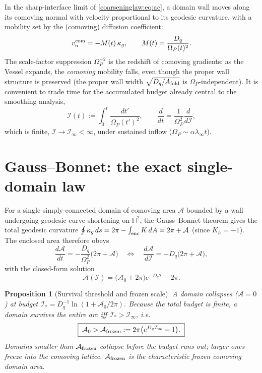 \documentclass[11pt,a4paper,oneside]{book}
\newcommand{\Op}{\Omega_P}
\newcommand{\Af}{A_{\rm fold}}
\newcommand{\Hh}{\mathbb{H}^2}
\newcommand{\Dq}{D_q}
\newcommand{\Ibud}{\mathcal I}
\newcommand{\Acom}{\mathcal A}
\theoremstyle{plain}
\newtheorem{proposition}{Proposition}[chapter]
\theoremstyle{definition}
\theoremstyle{remark}
\begin{document}
In the sharp-interface limit of \eqref{coarseninglaw:eq:ac}, a domain wall moves along its comoving normal with velocity
proportional to its geodesic curvature, with a mobility set by the (comoving) diffusion coefficient:
\begin{equation}
v_n^{\rm com}=-M(t)\,\kappa_g,
\qquad
M(t)=\frac{\Dq}{\Op(t)^{2}} .
\end{equation}
The scale-factor suppression $\Op^{-2}$ is the redshift of comoving gradients: as the Vessel expands, the
\emph{comoving} mobility falls, even though the proper wall structure is preserved (the proper wall width
$\sqrt{\Dq/\Af}$ is $\Op$-independent). It is convenient to trade time for the accumulated
budget already central to the smoothing analysis,
\begin{equation}
\Ibud(t):=\int_0^t\frac{dt'}{\Op(t')^{2}},
\qquad
\frac{d}{dt}=\frac{1}{\Op^2}\frac{d}{d\Ibud},
\end{equation}
which is finite, $\Ibud\to\Ibud_\infty<\infty$, under sustained inflow ($\Op\sim\alpha\lambda_\infty t$).

\section{Gauss--Bonnet: the exact single-domain law}

For a single simply-connected domain of comoving area $\Acom$ bounded by a wall undergoing geodesic
curve-shortening on $\Hh$, the Gauss--Bonnet theorem gives the total geodesic curvature
$\oint\kappa_g\,ds=2\pi-\int_{\rm enc}K\,dA=2\pi+\Acom$ (since $K_h=-1$). The enclosed area therefore obeys
\begin{equation}
\boxed{\;\frac{d\Acom}{dt}=-\frac{\Dq}{\Op^{2}}\bigl(2\pi+\Acom\bigr)
\quad\Longleftrightarrow\quad
\frac{d\Acom}{d\Ibud}=-\Dq\bigl(2\pi+\Acom\bigr),\;}
\end{equation}
with the closed-form solution
\begin{equation}
\boxed{\;\Acom(\Ibud)=\bigl(\Acom_0+2\pi\bigr)e^{-\Dq\Ibud}-2\pi .\;}
\end{equation}

\begin{proposition}[Survival threshold and frozen scale]\label{coarseninglaw:prop:gb}
A domain collapses ($\Acom=0$) at budget $\Ibud_\ast=\Dq^{-1}\ln(1+\Acom_0/2\pi)$. Because the total
budget is finite, a domain survives the entire arc iff $\Ibud_\ast>\Ibud_\infty$, i.e.
\begin{equation}
\boxed{\;\Acom_0>\Acom_{\rm frozen}:=2\pi\bigl(e^{\Dq\Ibud_\infty}-1\bigr).\;}
\end{equation}
Domains smaller than $\Acom_{\rm frozen}$ collapse before the budget runs out; larger ones freeze into the
comoving lattice. $\Acom_{\rm frozen}$ is the characteristic frozen comoving domain area.
\end{proposition}
\end{document}
